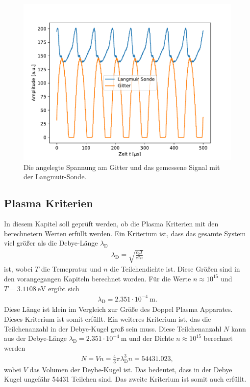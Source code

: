 \begin{figure}[H]
\centering
\includegraphics[scale=0.6]{oszi_3.pdf}
\caption{Die angelegte Spannung am Gitter und das gemessene Signal mit der Langmuir-Sonde.}
\label{fig:oszi_3}
\end{figure}
\subsection{Plasma Kriterien}
In diesem Kapitel soll geprüft werden, ob die Plasma Kriterien mit den berechnetern Werten erfüllt werden. Ein Kriterium ist, dass das gesamte System viel größer als die Debye-Länge $\lambda_{\mathrm{D}}$
\begin{align}
\lambda_{\mathrm{D}} = \sqrt{\frac{\epsilon_0 T}{e^2 n}}
\end{align}
ist, wobei $T$ die Temepratur und $n$ die Teilchendichte ist. Diese Größen sind in den vorangegangen Kapiteln berechnet worden. Für die Werte $n \approx 10^{15} $ und $T=3.1108\ \mathrm{eV} $ ergibt sich
\begin{align}
\lambda_{\mathrm{D}} = 2.351 \cdot 10^{-4}\ \mathrm{m}.
\end{align}
Diese Länge ist klein im Vergleich zur Größe des Doppel Plasma Apparates. Dieses Kriterium ist somit erfüllt.  Ein weiteres Kriterium ist, das die Teilchenanzahl in der Debye-Kugel groß sein muss. Diese Teilchenanzahl  $N$ kann aus der Debye-Länge $\lambda_{\mathrm{D}}= 2.351 \cdot 10^{-4}\ \mathrm{m}$ und der Dichte $n \approx 10^{15}$ berechnet werden
\begin{align}
N = V n= \frac{4}{3}\pi \lambda_{\mathrm{D}}^3 n = 54431.023 ,
\end{align}
wobei $V$ das Volumen der Deybe-Kugel ist. Das bedeutet, dass in der Debye Kugel ungefähr 54431 Teilchen sind. Das zweite Kriterium ist somit auch erfüllt. 

